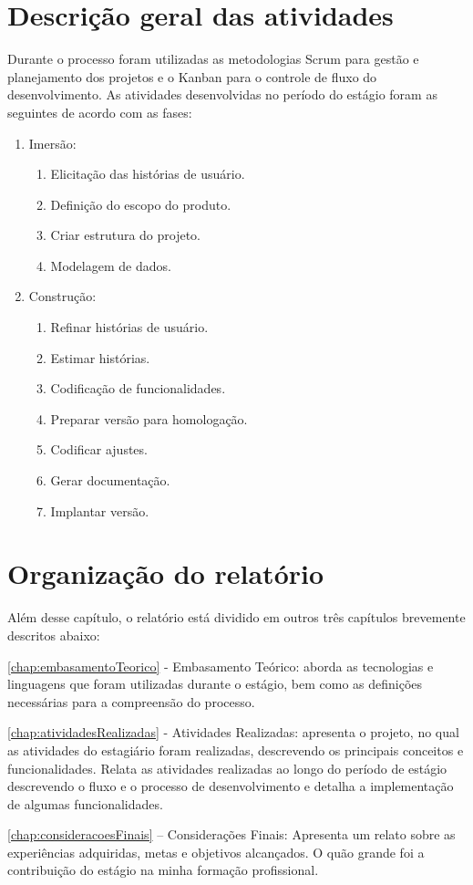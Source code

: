 \section{Descrição geral das atividades}
\label{sec:descricaoGeralAtividades}
Durante o processo foram utilizadas as metodologias Scrum para gestão e planejamento dos projetos e o Kanban para o controle de fluxo do desenvolvimento. As atividades desenvolvidas no período do estágio foram as seguintes de acordo com as fases: 
\begin{enumerate}
    \item Imersão:
    \begin{enumerate}
        \item Elicitação das histórias de usuário.
        \item Definição do escopo do produto.
        \item Criar estrutura do projeto.
        \item Modelagem de dados.
    \end{enumerate}
   \item Construção:
   \begin{enumerate}
        \item Refinar histórias de usuário.
        \item Estimar histórias.
        \item Codificação de funcionalidades.
        \item Preparar versão para homologação.
        \item Codificar ajustes.
        \item Gerar documentação.
        \item Implantar versão.
   \end{enumerate}
\end{enumerate}

\section{Organização do relatório}
\label{sec:organizacaoRelatorio}
Além desse capítulo, o relatório está dividido em outros três capítulos brevemente descritos abaixo:

\autoref{chap:embasamentoTeorico} - Embasamento Teórico: aborda as tecnologias e linguagens que foram utilizadas durante o estágio, bem como as definições necessárias para a compreensão do processo.

\autoref{chap:atividadesRealizadas} - Atividades Realizadas: apresenta o projeto, no qual as atividades do estagiário foram realizadas, descrevendo os principais conceitos e funcionalidades. Relata as atividades realizadas ao longo do período de estágio descrevendo o fluxo e o processo de desenvolvimento e detalha a implementação de algumas funcionalidades.

\autoref{chap:consideracoesFinais} – Considerações Finais: Apresenta um relato sobre as experiências adquiridas, metas e objetivos alcançados. O quão grande foi a contribuição do estágio na minha formação profissional.

